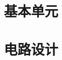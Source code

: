 \documentclass{xNoteBook}
\begin{document}

\maketitle

\frontmatter
\makesymb

\tableofcontents
\listoffigures
\listoftables

\mainmatter

\nocite{*}

\part{基本单元}





\part{电路设计}




\appendix

\backmatter



\end{document}
